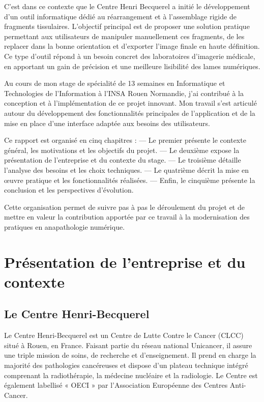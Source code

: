 \documentclass[11pt,a4paper]{report}
\begin{document}
C'est dans ce contexte que le Centre Henri Becquerel a initié le développement d'un outil informatique dédié au réarrangement et à l'assemblage rigide de fragments tissulaires. L'objectif principal est de proposer une solution pratique permettant aux utilisateurs de manipuler manuellement ces fragments, de les replacer dans la bonne orientation et d'exporter l'image finale en haute définition. Ce type d'outil répond à un besoin concret des laboratoires d'imagerie médicale, en apportant un gain de précision et une meilleure lisibilité des lames numériques.

Au cours de mon stage de spécialité de 13 semaines en Informatique et Technologies de l'Information à l'INSA Rouen Normandie, j'ai contribué à la conception et à l'implémentation de ce projet innovant. Mon travail s'est articulé autour du développement des fonctionnalités principales de l'application et de la mise en place d'une interface adaptée aux besoins des utilisateurs.

Ce rapport est organisé en cinq chapitres :
— Le premier présente le contexte général, les motivations et les objectifs du projet.
— Le deuxième expose la présentation de l'entreprise et du contexte du stage.
— Le troisième détaille l'analyse des besoins et les choix techniques.
— Le quatrième décrit la mise en œuvre pratique et les fonctionnalités réalisées.
— Enfin, le cinquième présente la conclusion et les perspectives d'évolution.

Cette organisation permet de suivre pas à pas le déroulement du projet et de mettre en valeur la contribution apportée par ce travail à la modernisation des pratiques en anapathologie numérique.

\newpage

\chapter{Présentation de l'entreprise et du contexte}

\section{Le Centre Henri-Becquerel}

Le Centre Henri-Becquerel est un Centre de Lutte Contre le Cancer (CLCC) situé à Rouen, en France. Faisant partie du réseau national Unicancer, il assure une triple mission de soins, de recherche et d'enseignement. Il prend en charge la majorité des pathologies cancéreuses et dispose d'un plateau technique intégré comprenant la radiothérapie, la médecine nucléaire et la radiologie. Le Centre est également labellisé « OECI » par l'Association Européenne des Centres Anti-Cancer.
\end{document}
